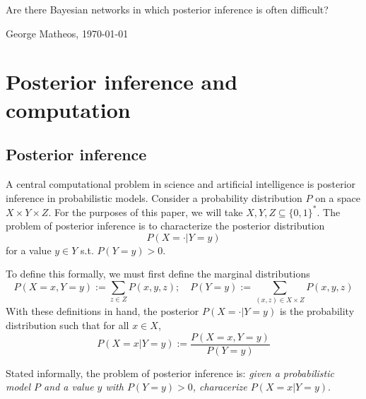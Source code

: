 \documentclass{article}
\theoremstyle{definition}
\theoremstyle{remark}
\begin{document}
\begin{center}
    \Large
    Are there Bayesian networks in which posterior inference is often difficult?

    \vspace{3pt}
    \normalsize
    George Matheos, \today
\end{center}

\section{Posterior inference and computation}

\subsection{Posterior inference}

A central computational problem in science and artificial intelligence is posterior inference in probabilistic models.
Consider a probability distribution $P$ on a space $X \times Y \times Z$.
For the purposes of this paper, we will take $X, Y, Z \subseteq \{0, 1\}^*$.
The problem of posterior inference is to characterize the posterior distribution
$$
P(X = \cdot | Y = y)
$$
for a value $y \in Y$ s.t. $P(Y = y) > 0$.

To define this formally, we must first define the marginal distributions
$$
P(X = x, Y = y) := \sum_{z \in Z} P(x, y, z); \quad P(Y = y) := \sum_{(x, z) \in X \times Z} P(x, y, z)
$$
With these definitions in hand, the posterior $P(X = \cdot | Y = y)$ is the probability distribution such that for all $x \in X$,
$$
P(X = x | Y = y) := \frac{P(X = x, Y = y)}{P(Y = y)}
$$

Stated informally, the problem of posterior inference is:
\textit{given a probabilistic model $P$ and a value $y$ with $P(Y = y) > 0$, characerize $P(X = x | Y = y)$}.
\end{document}
